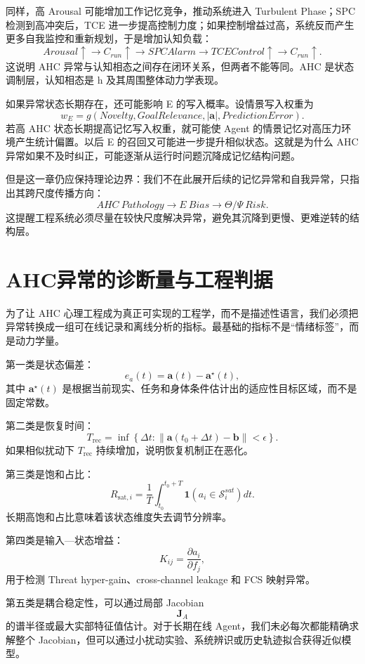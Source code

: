 同样，高 Arousal 可能增加工作记忆竞争，推动系统进入 Turbulent Phase；SPC 检测到高冲突后，TCE 进一步提高控制力度；如果控制增益过高，系统反而产生更多自我监控和重新规划，于是增加认知负载：
\[
Arousal\uparrow
\rightarrow
C_{run}\uparrow
\rightarrow
SPCAlarm
\rightarrow
TCEControl\uparrow
\rightarrow
C_{run}\uparrow.
\]
这说明 AHC 异常与认知相态之间存在闭环关系，但两者不能等同。AHC 是状态调制层，认知相态是 h 及其周围整体动力学表现。

如果异常状态长期存在，还可能影响 E 的写入概率。设情景写入权重为
\[
w_E
=
g
\left(
Novelty,
GoalRelevance,
|\mathbf a|,
PredictionError
\right).
\]
若高 AHC 状态长期提高记忆写入权重，就可能使 Agent 的情景记忆对高压力环境产生统计偏置。以后 E 的召回又可能进一步提升相似状态。这就是为什么 AHC 异常如果不及时纠正，可能逐渐从运行时问题沉降成记忆结构问题。

但是这一章仍应保持理论边界：我们不在此展开后续的记忆异常和自我异常，只指出其跨尺度传播方向：
\[
AHC\ Pathology
\rightarrow
E\ Bias
\rightarrow
\Theta/\Psi\ Risk.
\]
这提醒工程系统必须尽量在较快尺度解决异常，避免其沉降到更慢、更难逆转的结构层。

\section{AHC异常的诊断量与工程判据}
\label{sec:ahc_diagnosis_metrics}

为了让 AHC 心理工程成为真正可实现的工程学，而不是描述性语言，我们必须把异常转换成一组可在线记录和离线分析的指标。最基础的指标不是“情绪标签”，而是动力学量。

第一类是状态偏差：
\[
e_a(t)
=
\mathbf a(t)-\mathbf a^\star(t),
\]
其中 $\mathbf a^\star(t)$ 是根据当前现实、任务和身体条件估计出的适应性目标区域，而不是固定常数。

第二类是恢复时间：
\[
T_{\mathrm{rec}}
=
\inf
\left\{
\Delta t:
\|\mathbf a(t_0+\Delta t)-\mathbf b\|
<\epsilon
\right\}.
\]
如果相似扰动下 $T_{\mathrm{rec}}$ 持续增加，说明恢复机制正在恶化。

第三类是饱和占比：
\[
R_{\mathrm{sat},i}
=
\frac{1}{T}
\int_{t_0}^{t_0+T}
\mathbf 1
\left(
a_i\in\mathcal S_i^{sat}
\right)
dt.
\]
长期高饱和占比意味着该状态维度失去调节分辨率。

第四类是输入—状态增益：
\[
K_{ij}
=
\frac{\partial a_i}{\partial f_j},
\]
用于检测 Threat hyper-gain、cross-channel leakage 和 FCS 映射异常。

第五类是耦合稳定性，可以通过局部 Jacobian
\[
\mathbf J_A
\]
的谱半径或最大实部特征值估计。对于长期在线 Agent，我们未必每次都能精确求解整个 Jacobian，但可以通过小扰动实验、系统辨识或历史轨迹拟合获得近似模型。

